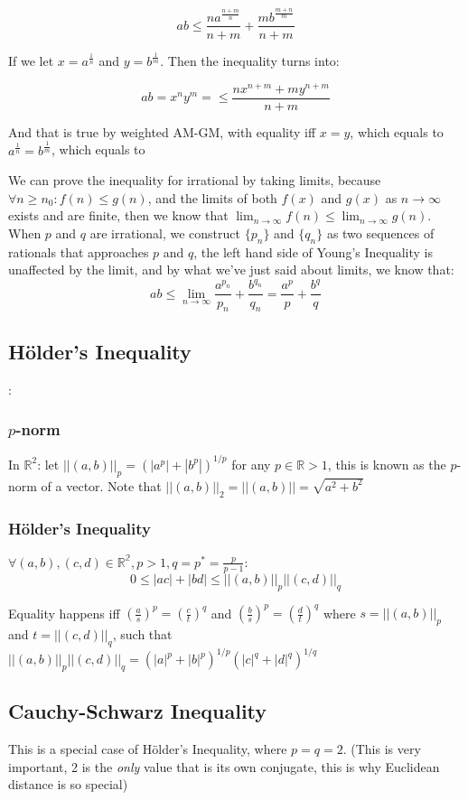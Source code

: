 $$ab \leq \frac{na^{\frac{n + m}{n}}}{n + m} + \frac{mb^{\frac{m + n}{m}}}{n + m}$$

If we let $x = a^{\frac{1}{n}}$ and $y = b^{\frac{1}{m}}$. Then the inequality
turns into:

$$ab = x^ny^m = \leq \frac{nx^{n + m} + my^{n + m}}{n + m}$$

And that is true by weighted AM-GM, with equality iff $x = y$, which equals to
$a^{\frac{1}{n}} = b^{\frac{1}{m}}$, which equals to 

We can prove the inequality for irrational by taking limits, because
$\forall n \geq n_0: f(n) \leq g(n)$, and the limits of both $f(x)$ and $g(x)$ as
$n\to\infty$ exists and are finite, then we know that $\lim_{n\to\infty}f(n)
\leq \lim_{n\to\infty} g(n)$. When $p$ and $q$ are irrational, we construct
$\{p_n\}$ and $\{q_n\}$ as two sequences of rationals that approaches $p$ and
$q$, the left hand side of Young's Inequality is unaffected by the limit, and by
what we've just said about limits, we know that:
$$ab \leq \lim_{n\to\infty} \frac{a^{p_n}}{p_n} + \frac{b^{q_n}}{q_n} =
\frac{a^p}{p} + \frac{b^q}{q}$$

\subsection{H\"{o}lder's Inequality}:
\subsubsection{$p$-norm}
In $\mathbb{R}^2$: let $||(a, b)||_p = (|a^p| + |b^p|)^{1/p}$ for any $p \in
\mathbb{R} > 1$, this is known as the $p$-norm of a vector. Note that $||(a,
b)||_2 = ||(a, b)|| = \sqrt{a^2 + b^2}$

\subsubsection{H\"{o}lder's Inequality}
$\forall (a, b), (c, d) \in \mathbb{R^2}, p > 1, q = p^* = \frac{p}{p-1}$:
$$ 0 \leq |ac| + |bd| \leq ||(a, b)||_p||(c, d)||_q$$

Equality happens iff $(\frac{a}{s})^p = (\frac{c}{t})^q$ and $(\frac{b}{s})^p =
(\frac{d}{t})^q$ where $s = ||(a, b)||_p$ and $t = ||(c, d)||_q$, such that $||(a, b)||_p||(c, d)||_q = (|a|^p + |b|^p)^{1/p}(|c|^q + |d|^q)^{1/q}$

\subsection{Cauchy-Schwarz Inequality}
This is a special case of H\"{o}lder's Inequality, where $p = q = 2$. (This is very important, 2 is the \textit{only} value that is its own conjugate, this is why Euclidean distance is so special)

